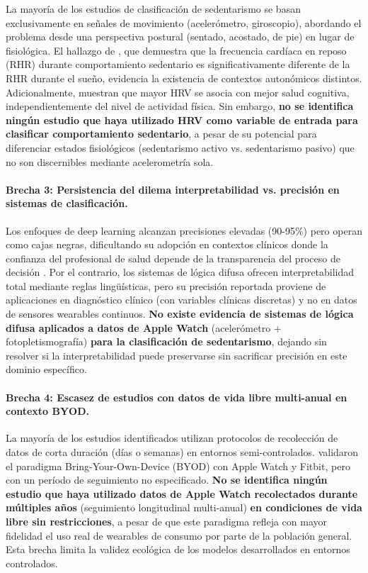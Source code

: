 La mayoría de los estudios de clasificación de sedentarismo se basan exclusivamente en señales de movimiento (acelerómetro, giroscopio), abordando el problema desde una perspectiva postural (sentado, acostado, de pie) en lugar de fisiológica. El hallazgo de \cite{Godkin2025Context}, que demuestra que la frecuencia cardíaca en reposo (RHR) durante comportamiento sedentario es significativamente diferente de la RHR durante el sueño, evidencia la existencia de contextos autonómicos distintos. Adicionalmente, \cite{Marino2024ARIC} muestran que mayor HRV se asocia con mejor salud cognitiva, independientemente del nivel de actividad física. Sin embargo, \textbf{no se identifica ningún estudio que haya utilizado HRV como variable de entrada para clasificar comportamiento sedentario}, a pesar de su potencial para diferenciar estados fisiológicos (sedentarismo activo vs. sedentarismo pasivo) que no son discernibles mediante acelerometría sola.

\paragraph{Brecha 3: Persistencia del dilema interpretabilidad vs. precisión en sistemas de clasificación.}

Los enfoques de deep learning \cite{Khan2024Wearable, Bassani2025DLHAR} alcanzan precisiones elevadas (90-95\%) pero operan como cajas negras, dificultando su adopción en contextos clínicos donde la confianza del profesional de salud depende de la transparencia del proceso de decisión \cite{Bienefeld2023XAI}. Por el contrario, los sistemas de lógica difusa \cite{Capitoli2025FuzzyXAI, MarashiHosseini2023Dietary} ofrecen interpretabilidad total mediante reglas lingüísticas, pero su precisión reportada proviene de aplicaciones en diagnóstico clínico (con variables clínicas discretas) y no en datos de sensores wearables continuos. \textbf{No existe evidencia de sistemas de lógica difusa aplicados a datos de Apple Watch} (acelerómetro + fotopletismografía) \textbf{para la clasificación de sedentarismo}, dejando sin resolver si la interpretabilidad puede preservarse sin sacrificar precisión en este dominio específico.

\paragraph{Brecha 4: Escasez de estudios con datos de vida libre multi-anual en contexto BYOD.}

La mayoría de los estudios identificados utilizan protocolos de recolección de datos de corta duración (días o semanas) en entornos semi-controlados. \cite{Fuller2021Predicting} validaron el paradigma Bring-Your-Own-Device (BYOD) con Apple Watch y Fitbit, pero con un período de seguimiento no especificado. \textbf{No se identifica ningún estudio que haya utilizado datos de Apple Watch recolectados durante múltiples años} (seguimiento longitudinal multi-anual) \textbf{en condiciones de vida libre sin restricciones}, a pesar de que este paradigma refleja con mayor fidelidad el uso real de wearables de consumo por parte de la población general. Esta brecha limita la validez ecológica de los modelos desarrollados en entornos controlados.

